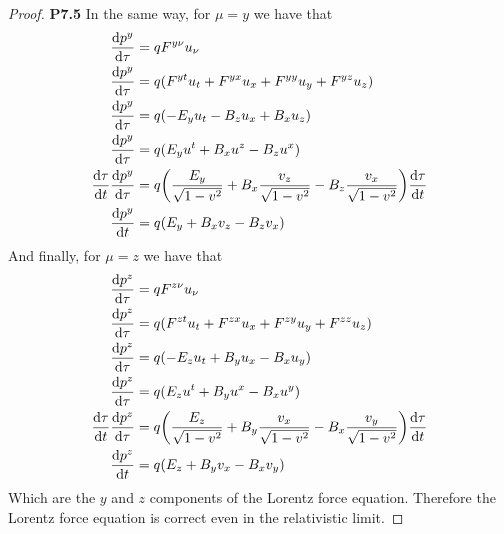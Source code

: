\documentclass[11pt]{article}
\theoremstyle{definition}
\begin{document}
\begin{proof}{\textbf{P7.5}}
    In the same way, for $\mu = y$ we have that
    \begin{align*}
        \derivative{p^y}{\tau} &= qF^{y\nu}u_\nu\\
        \derivative{p^y}{\tau} &=
        q(F^{yt}u_t + F^{yx}u_x + F^{yy}u_y + F^{yz}u_z)\\
        \derivative{p^y}{\tau} &= q(-E_yu_t - B_zu_x + B_xu_z)\\
        \derivative{p^y}{\tau} &= q(E_yu^t + B_xu^z - B_zu^x)\\
        \derivative{\tau}{t}\derivative{p^y}{\tau} &=
        q\bigg(\frac{E_y}{\sqrt{1 - v^2}} + B_x\frac{v_z}{\sqrt{1 - v^2}}
        - B_z\frac{v_x}{\sqrt{1 - v^2}}\bigg)\derivative{\tau}{t}\\
        \derivative{p^y}{t} &= q(E_y + B_x v_z - B_z v_x)
    \end{align*}
    And finally, for $\mu = z$ we have that
    \begin{align*}
        \derivative{p^z}{\tau} &= qF^{z\nu}u_\nu\\
        \derivative{p^z}{\tau} &=
        q(F^{zt}u_t + F^{zx}u_x + F^{zy}u_y + F^{zz}u_z)\\
        \derivative{p^z}{\tau} &= q(-E_zu_t + B_yu_x - B_xu_y)\\
        \derivative{p^z}{\tau} &= q(E_zu^t + B_yu^x - B_xu^y)\\
        \derivative{\tau}{t}\derivative{p^z}{\tau} &=
        q\bigg(\frac{E_z}{\sqrt{1 - v^2}} + B_y\frac{v_x}{\sqrt{1 - v^2}}
        - B_x\frac{v_y}{\sqrt{1 - v^2}}\bigg)\derivative{\tau}{t}\\
        \derivative{p^z}{t} &= q(E_z + B_y v_x - B_x v_y)
    \end{align*}
    Which are the $y$ and $z$ components of the Lorentz force equation.
    Therefore the Lorentz force equation is correct even in the relativistic
    limit.
\end{proof}
\end{document}
